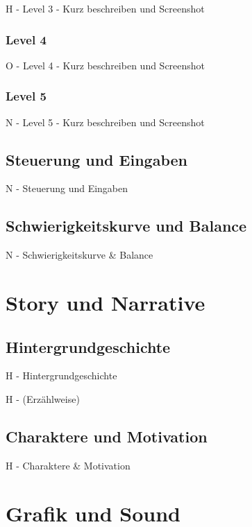 \documentclass[oneside]{ausarbeitung}
\begin{document}
H  - Level 3
   - Kurz beschreiben und Screenshot


\subsection{Level 4}

O  - Level 4
   - Kurz beschreiben und Screenshot


\subsection{Level 5}

N  - Level 5
   - Kurz beschreiben und Screenshot


\section{Steuerung und Eingaben}

N - Steuerung und Eingaben


\section{Schwierigkeitskurve und Balance}

N - Schwierigkeitskurve & Balance


\chapter{Story und Narrative}

\section{Hintergrundgeschichte}

H - Hintergrundgeschichte


H - (Erzählweise)


\section{Charaktere und Motivation}

H - Charaktere & Motivation


\chapter{Grafik und Sound}
\end{document}
